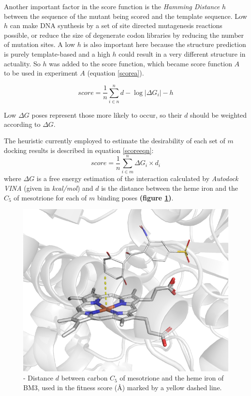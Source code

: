 \documentclass[16pt]{article}
\begin{document}
Another important factor in the score function is the \textit{Hamming Distance} $h$ between the sequence of the mutant being scored and the template sequence.
Low $h$ can make DNA synthesis by a set of site directed mutagenesis reactions possible, or reduce the size of degenerate codon libraries by reducing the number of mutation sites.
A low $h$ is also important here because the structure prediction is purely template-based and a high $h$ could result in a very different structure in actuality.
So $h$ was added to the score function, which became score function $A$ to be used in experiment $A$ (equation \ref{scorea}).

\begin{equation}
	score = \frac{1}{n} \sum^{n}_{i\in n} d - \log{|\Delta G_{i}|} - h
\end{equation}

Low $\Delta G$ poses represent those more likely to occur, so their $d$ should be weighted according to $\Delta G$.



The heuristic currently employed to estimate the desirability of each set of $m$ docking results is described in equation \ref{scoreeqn}: %
\begin{equation}\label{scoreeqn}
	score = \frac{1}{n}\sum^{n}_{i\in m} \Delta G_{i} \times d_{i}
\end{equation}
where $\Delta G$ is a free energy estimation of the interaction calculated by \textit{Autodock VINA} (given in \textit{kcal/mol}) and $d$ is the distance between the heme iron and the $C_{5}$ of mesotrione for each of $m$ binding poses \textbf{(figure \ref{score})}. 

\begin{figure}
	\includegraphics[width=\textwidth]{img/score.png}
	\caption{\label{score} - Distance $d$  between carbon $C_5$ of mesotrione and the heme iron of BM3, used in the fitness score (\AA) marked by a yellow dashed line.}
\end{figure}
\end{document}
